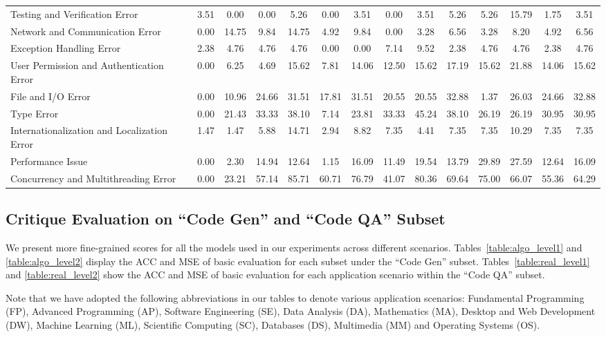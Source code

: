 \documentclass[11pt, a4paper, logo, copyright, nonumbering, amsart]{map}
\begin{document}
\begin{CJK*}{UTF8}{gbsn}
\begin{table*}[t]
\begin{adjustbox}{width=\textwidth}
\begin{tabular}{l|ccccccccccccc}
        Testing and Verification Error & 3.51 & 0.00 & 0.00 & 5.26 & 0.00 & 3.51 & 0.00 & 3.51 & 5.26 & 5.26 & 15.79 & 1.75 & 3.51 \\
        Network and Communication Error & 0.00 & 14.75 & 9.84 & 14.75 & 4.92 & 9.84 & 0.00 & 3.28 & 6.56 & 3.28 & 8.20 & 4.92 & 6.56 \\
        Exception Handling Error & 2.38 & 4.76 & 4.76 & 4.76 & 0.00 & 0.00 & 7.14 & 9.52 & 2.38 & 4.76 & 4.76 & 2.38 & 4.76 \\
        User Permission and Authentication Error & 0.00 & 6.25 & 4.69 & 15.62 & 7.81 & 14.06 & 12.50 & 15.62 & 17.19 & 15.62 & 21.88 & 14.06 & 15.62 \\
        File and I/O Error & 0.00 & 10.96 & 24.66 & 31.51 & 17.81 & 31.51 & 20.55 & 20.55 & 32.88 & 1.37 & 26.03 & 24.66 & 32.88 \\
        Type Error & 0.00 & 21.43 & 33.33 & 38.10 & 7.14 & 23.81 & 33.33 & 45.24 & 38.10 & 26.19 & 26.19 & 30.95 & 30.95 \\
        Internationalization and Localization Error & 1.47 & 1.47 & 5.88 & 14.71 & 2.94 & 8.82 & 7.35 & 4.41 & 7.35 & 7.35 & 10.29 & 7.35 & 7.35 \\
        Performance Issue & 0.00 & 2.30 & 14.94 & 12.64 & 1.15 & 16.09 & 11.49 & 19.54 & 13.79 & 29.89 & 27.59 & 12.64 & 16.09 \\
        Concurrency and Multithreading Error & 0.00 & 23.21 & 57.14 & 85.71 & 60.71 & 76.79 & 41.07 & 80.36 & 69.64 & 75.00 & 66.07 & 55.36 & 64.29 \\
        \bottomrule
    \end{tabular}
    \end{adjustbox}
\end{table*}

\subsection{Critique Evaluation on ``Code Gen'' and ``Code QA'' Subset} \label{ap:main_subset}

We present more fine-grained scores for all the models used in our experiments across different scenarios. Tables~\ref{table:algo_level1} and \ref{table:algo_level2} display the ACC and MSE of basic evaluation for each subset under the ``Code Gen'' subset. Tables~\ref{table:real_level1} and \ref{table:real_level2} show the ACC and MSE of basic evaluation for each application scenario within the ``Code QA'' subset. 

Note that we have adopted the following abbreviations in our tables to denote various application scenarios: Fundamental Programming (FP), Advanced Programming (AP), Software Engineering (SE), Data Analysis (DA), Mathematics (MA), Desktop and Web Development (DW), Machine Learning (ML), Scientific Computing (SC), Databases (DS), Multimedia (MM) and Operating Systems (OS).


\end{CJK*}
\end{document}
